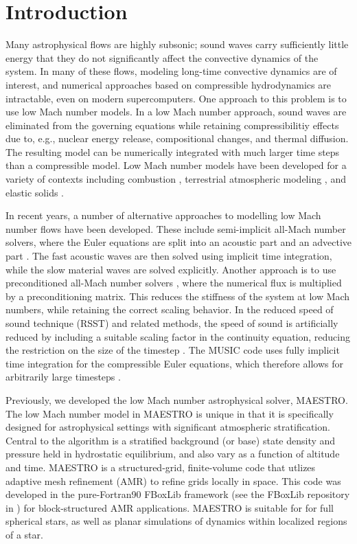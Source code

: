 \section{Introduction} \label{sec:intro}
Many astrophysical flows are highly subsonic; sound waves carry sufficiently little energy that they do not significantly affect the convective dynamics of the system.
In many of these flows, modeling long-time convective dynamics are of interest, and numerical approaches based on compressible hydrodynamics are intractable, even on modern supercomputers.
One approach to this problem is to use low Mach number models.
In a low Mach number approach, sound waves are eliminated from the governing equations while retaining compressibilitiy effects due to, e.g., nuclear energy release, compositional changes, and thermal diffusion.
The resulting model can be numerically integrated with much larger time steps than a compressible model.
Low Mach number models have been developed for a variety of contexts including combustion \citep{day2000numerical}, terrestrial atmospheric modeling \citep{duarte2015low},
and elastic solids \citep{abbate2017all}.

In recent years, a number of alternative approaches to modelling low Mach number flows have been developed. These include semi-implicit all-Mach number solvers, where the Euler equations
are split into an acoustic part and an advective part \citep{Degond2009,Cordier2012,Haack2012,Chalons2016,Kwatra2009,Happenhofer2013,Padioleau2019}. The fast acoustic waves are then
solved using implicit time integration, while the slow material waves are solved explicitly. Another approach is to use preconditioned all-Mach number solvers
\citep{Miczek2014,Barsukow2016}, where the numerical flux is multiplied by a preconditioning matrix. This reduces the stiffness of the system at low Mach numbers, while retaining the
correct scaling behavior. In the reduced speed of sound technique (RSST) and related methods, the speed of sound is artificially reduced by including a suitable scaling factor in the
continuity equation, reducing the restriction on the size of the timestep \citep{Rempel2005,Hotta2012,Wang2015,Takeyama2017,Iijima2018}. The MUSIC code uses fully implicit time integration for the compressible Euler equations, which therefore allows for arbitrarily large timesteps \citep{Viallet2011,Viallet2015,Goffrey2016}.

Previously, we developed the low Mach number astrophysical solver, MAESTRO.
The low Mach number model in MAESTRO is unique in that it is specifically designed for astrophysical settings with significant atmospheric stratification.
Central to the algorithm is a stratified background (or base) state density and pressure held in hydrostatic equilibrium, and also vary as a function of altitude and time.
MAESTRO is a structured-grid, finite-volume code that utlizes adaptive mesh refinement (AMR) to refine grids locally in space.
This code was developed in the pure-Fortran90 FBoxLib framework (see the FBoxLib repository in \cite{AMReX}) for block-structured AMR applications.
MAESTRO is suitable for for full spherical stars, as well as planar simulations of dynamics within localized regions of a star.

